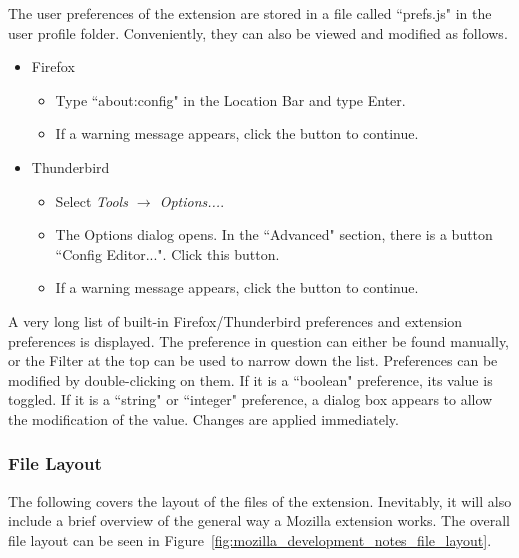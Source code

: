 The user preferences of the extension are stored in a file called ``prefs.js" in the user profile folder. Conveniently, they can also be viewed and modified as follows. 
\begin{itemize}
  \item Firefox \begin{itemize}
    \item Type ``about:config" in the Location Bar and type Enter.
    \item If a warning message appears, click the button to continue.
  \end{itemize}
  \item Thunderbird \begin{itemize}
    \item Select \emph{Tools $\rightarrow$ Options...}.
    \item The Options dialog opens. In the ``Advanced" section, there is a button ``Config Editor...". Click this button.
    \item If a warning message appears, click the button to continue.
  \end{itemize}
\end{itemize}
A very long list of built-in Firefox/Thunderbird preferences and extension preferences is displayed. The preference in question can either be found manually, or the Filter at the top can be used to narrow down the list. Preferences can be modified by double-clicking on them. If it is a ``boolean" preference, its value is toggled. If it is a ``string" or ``integer" preference, a dialog box appears to allow the modification of the value. Changes are applied immediately. 

\subsubsection{File Layout}
The following covers the layout of the files of the extension. Inevitably, it will also include a brief overview of the general way a Mozilla extension works. The overall file layout can be seen in Figure~\ref{fig:mozilla_development_notes_file_layout}.

